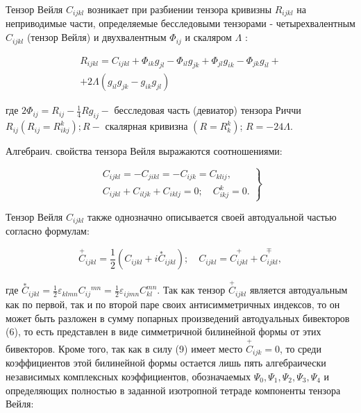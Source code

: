 \documentclass[10pt]{article}
\begin{document}
Тензор Вейля $C_{i j k l}$ возникает при разбиении тензора кривизны $R_{i j k l}$ на неприводимые части, определяемые бесследовыми тензорами - четырехвалентным $C_{i j k l}$ (тензор Вейля) и двухвалентным $\Phi_{i j}$ и скаляром $\Lambda$ :



\[

\begin{gathered}

R_{i j k l}=C_{i j k l}+\Phi_{i k} g_{j l}-\Phi_{i l} g_{j k}+\Phi_{j l} g_{i k}-\Phi_{j k} g_{i l}+ \\

+2 \Lambda\left(g_{i l} g_{j k}-g_{i k} g_{j l}\right)

\end{gathered}

\]



где $2 \Phi_{i j}=R_{i j}-\frac{1}{4} R g_{i j}-$ бесследовая часть (девиатор) тензора Риччи $R_{i j}\left(R_{i j}=R_{i k j}^{k}\right) ; R-$ скалярная кривизна $\left(R=R_{k}^{k}\right)$; $R=-24 \Lambda$.



Алгебраич. свойства тензора Вейля выражаются соотношениями:



\[

\left.\begin{array}{c}

C_{i j k l}=-C_{j i k l}=-C_{i j k}=C_{k l i j}, \\

C_{i j k l}+C_{i l j k}+C_{i k l j}=0 ; \quad C_{i k j}^{k}=0 .

\end{array}\right\}

\]



Тензор Вейля $C_{i j k l}$ также однозначно описывается своей автодуальной частью согласно формулам:



\[

\stackrel{+}{C}_{i j k l}=\frac{1}{2}\left(C_{i j k l}+i \stackrel{*}{C}_{i j k l}\right) ; \quad C_{i j k l}={\stackrel{+}{C_{i j k l}}}+\stackrel{\mp}{C_{i j k l}},

\]



где $\stackrel{*}{C}_{i j k l}=\frac{1}{2} \varepsilon_{k l m n} C_{i j}{ }^{m n}=\frac{1}{2} \varepsilon_{i j m n} C_{k l}^{m n}$. Так как тензор $\stackrel{+}{C}_{i j k l}$ является автодуальным как по первой, так и по второй паре своих антисимметричных индексов, то он может быть разложен в сумму попарных произведений автодуальных бивекторов (6), то есть представлен в виде симметричной билинейной формы от этих бивекторов. Кроме того, так как в силу (9) имеет место $\stackrel{+}{C}_{i j k}=0$, то среди коэффициентов этой билинейной формы остается лишь пять алгебраически независимых комплексных коэффициентов, обозначаемых $\Psi_{0}, \Psi_{1}, \Psi_{2}, \Psi_{3}, \Psi_{4}$ и определяющих полностью в заданной изотропной тетраде компоненты тензора Вейля:
\end{document}
